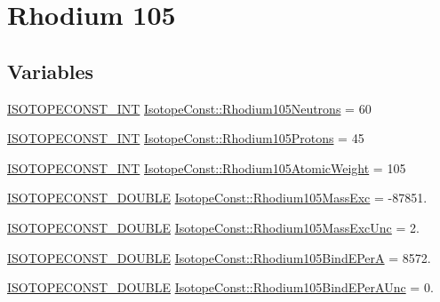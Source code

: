 \hypertarget{group___isotope_const-_rhodium-_rh105}{}\section{Rhodium 105}
\label{group___isotope_const-_rhodium-_rh105}
\subsection*{Variables}
\begin{DoxyCompactItemize}
\item 
\mbox{\hyperlink{group___isotope_const-_macros_ga5f18360b3e99483a35c32d789e62621c}{I\+S\+O\+T\+O\+P\+E\+C\+O\+N\+S\+T\+\_\+\+I\+NT}} \mbox{\hyperlink{group___isotope_const-_rhodium-_rh105_ga2c3063c364426c8781e99438d78cf205}{Isotope\+Const\+::\+Rhodium105\+Neutrons}} = 60
\item 
\mbox{\hyperlink{group___isotope_const-_macros_ga5f18360b3e99483a35c32d789e62621c}{I\+S\+O\+T\+O\+P\+E\+C\+O\+N\+S\+T\+\_\+\+I\+NT}} \mbox{\hyperlink{group___isotope_const-_rhodium-_rh105_ga68484de76e7a803c91153d80df52e137}{Isotope\+Const\+::\+Rhodium105\+Protons}} = 45
\item 
\mbox{\hyperlink{group___isotope_const-_macros_ga5f18360b3e99483a35c32d789e62621c}{I\+S\+O\+T\+O\+P\+E\+C\+O\+N\+S\+T\+\_\+\+I\+NT}} \mbox{\hyperlink{group___isotope_const-_rhodium-_rh105_ga498ef03291846392ca8a4f4e85d39c66}{Isotope\+Const\+::\+Rhodium105\+Atomic\+Weight}} = 105
\item 
\mbox{\hyperlink{group___isotope_const-_macros_ga8f45a7272ce02c0b4c65c44636ed719a}{I\+S\+O\+T\+O\+P\+E\+C\+O\+N\+S\+T\+\_\+\+D\+O\+U\+B\+LE}} \mbox{\hyperlink{group___isotope_const-_rhodium-_rh105_gaa22d856e2e6f1134afc2fc89408a9829}{Isotope\+Const\+::\+Rhodium105\+Mass\+Exc}} = -\/87851.
\item 
\mbox{\hyperlink{group___isotope_const-_macros_ga8f45a7272ce02c0b4c65c44636ed719a}{I\+S\+O\+T\+O\+P\+E\+C\+O\+N\+S\+T\+\_\+\+D\+O\+U\+B\+LE}} \mbox{\hyperlink{group___isotope_const-_rhodium-_rh105_ga3b79d40d088efb9bc4b861c58494e478}{Isotope\+Const\+::\+Rhodium105\+Mass\+Exc\+Unc}} = 2.
\item 
\mbox{\hyperlink{group___isotope_const-_macros_ga8f45a7272ce02c0b4c65c44636ed719a}{I\+S\+O\+T\+O\+P\+E\+C\+O\+N\+S\+T\+\_\+\+D\+O\+U\+B\+LE}} \mbox{\hyperlink{group___isotope_const-_rhodium-_rh105_gab9de9b7c2d8447708585f7e8192c8ba7}{Isotope\+Const\+::\+Rhodium105\+Bind\+E\+PerA}} = 8572.
\item 
\mbox{\hyperlink{group___isotope_const-_macros_ga8f45a7272ce02c0b4c65c44636ed719a}{I\+S\+O\+T\+O\+P\+E\+C\+O\+N\+S\+T\+\_\+\+D\+O\+U\+B\+LE}} \mbox{\hyperlink{group___isotope_const-_rhodium-_rh105_ga073288919f6c875b1f19c9d3260292f2}{Isotope\+Const\+::\+Rhodium105\+Bind\+E\+Per\+A\+Unc}} = 0.

\end{DoxyCompactItemize}
